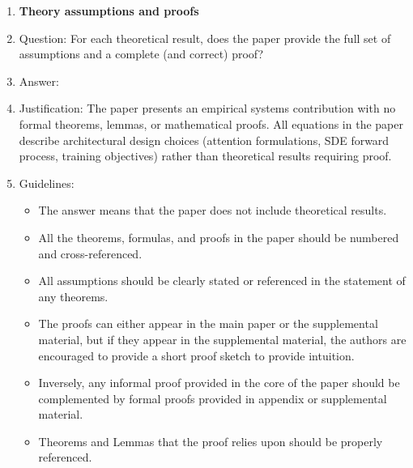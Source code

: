 \begin{enumerate}
\begin{itemize}
        \item While the authors might fear that complete honesty about limitations might be used by reviewers as grounds for rejection, a worse outcome might be that reviewers discover limitations that aren't acknowledged in the paper. The authors should use their best judgment and recognize that individual actions in favor of transparency play an important role in developing norms that preserve the integrity of the community. Reviewers will be specifically instructed to not penalize honesty concerning limitations.
    \end{itemize}

\item {\bf Theory assumptions and proofs}
    \item[] Question: For each theoretical result, does the paper provide the full set of assumptions and a complete (and correct) proof?
    \item[] Answer: \answerNA{}
    \item[] Justification: The paper presents an empirical systems contribution with no formal theorems, lemmas, or mathematical proofs. All equations in the paper describe architectural design choices (attention formulations, SDE forward process, training objectives) rather than theoretical results requiring proof.
    \item[] Guidelines:
    \begin{itemize}
        \item The answer \answerNA{} means that the paper does not include theoretical results.
        \item All the theorems, formulas, and proofs in the paper should be numbered and cross-referenced.
        \item All assumptions should be clearly stated or referenced in the statement of any theorems.
        \item The proofs can either appear in the main paper or the supplemental material, but if they appear in the supplemental material, the authors are encouraged to provide a short proof sketch to provide intuition.
        \item Inversely, any informal proof provided in the core of the paper should be complemented by formal proofs provided in appendix or supplemental material.
        \item Theorems and Lemmas that the proof relies upon should be properly referenced.
    \end{itemize}


\end{enumerate}
